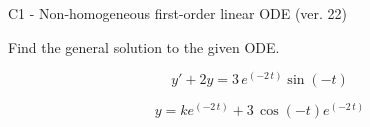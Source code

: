 \begin{exercise}
  \begin{exerciseTitle}C1 - Non-homogeneous first-order linear ODE (ver. 22)\end{exerciseTitle}
  \begin{exerciseStatement}
    
Find the general solution to the given ODE.

    
\[y'+2y= 3 \, e^{\left(-2 \, t\right)} \sin\left(-t\right)\]

  \end{exerciseStatement}
  \begin{exerciseAnswer}
    
\[y= k e^{\left(-2 \, t\right)} + 3 \, \cos\left(-t\right) e^{\left(-2 \, t\right)}\]

  \end{exerciseAnswer}
\end{exercise}